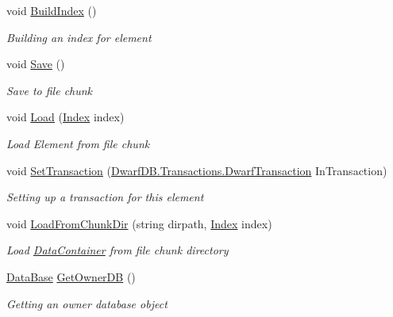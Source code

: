 \begin{DoxyCompactItemize}
\item 
void \hyperlink{class_dwarf_d_b_1_1_data_structures_1_1_data_container_a8f32eb712d14d6dbf42a95098673dd19}{Build\+Index} ()
\begin{DoxyCompactList}\small\item\em Building an index for element \end{DoxyCompactList}\item 
void \hyperlink{class_dwarf_d_b_1_1_data_structures_1_1_data_container_a3ca82caee7d6f38c74dbb4e2a637aecb}{Save} ()
\begin{DoxyCompactList}\small\item\em Save to file chunk \end{DoxyCompactList}\item 
void \hyperlink{class_dwarf_d_b_1_1_data_structures_1_1_data_container_ab045853ddb62b681d2474d7e547186de}{Load} (\hyperlink{class_dwarf_d_b_1_1_data_structures_1_1_index}{Index} index)
\begin{DoxyCompactList}\small\item\em Load Element from file chunk \end{DoxyCompactList}\item 
void \hyperlink{class_dwarf_d_b_1_1_data_structures_1_1_data_container_a40b2dc31b54b0d41b29e58ea5ea4a3fb}{Set\+Transaction} (\hyperlink{class_dwarf_d_b_1_1_transactions_1_1_dwarf_transaction}{Dwarf\+D\+B.\+Transactions.\+Dwarf\+Transaction} In\+Transaction)
\begin{DoxyCompactList}\small\item\em Setting up a transaction for this element \end{DoxyCompactList}\item 
void \hyperlink{class_dwarf_d_b_1_1_data_structures_1_1_data_container_a0a82f79c53628134d16f2fa21db221bf}{Load\+From\+Chunk\+Dir} (string dirpath, \hyperlink{class_dwarf_d_b_1_1_data_structures_1_1_index}{Index} index)
\begin{DoxyCompactList}\small\item\em Load \hyperlink{class_dwarf_d_b_1_1_data_structures_1_1_data_container}{Data\+Container} from file chunk directory \end{DoxyCompactList}\item 
\hyperlink{class_dwarf_d_b_1_1_data_structures_1_1_data_base}{Data\+Base} \hyperlink{class_dwarf_d_b_1_1_data_structures_1_1_data_container_a30765f0c417065245bb4c065c7eb29e0}{Get\+Owner\+D\+B} ()
\begin{DoxyCompactList}\small\item\em Getting an owner database object \end{DoxyCompactList}\item 

\end{DoxyCompactItemize}

